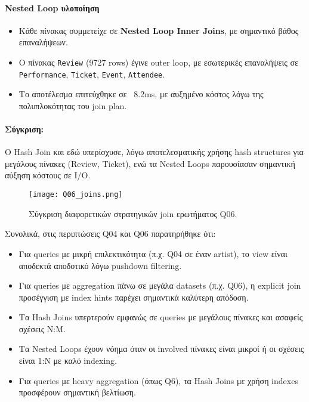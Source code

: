 \documentclass[13pt]{extarticle}
\begin{document}
\paragraph{Nested Loop υλοποίηση}
\begin{itemize}
    \item Κάθε πίνακας συμμετείχε σε \textbf{Nested Loop Inner Joins}, με σημαντικό βάθος επαναλήψεων.
    \item Ο πίνακας \texttt{Review} (9727 rows) έγινε outer loop, με εσωτερικές επαναλήψεις σε \texttt{Performance}, \texttt{Ticket}, \texttt{Event}, \texttt{Attendee}.
    \item Το αποτέλεσμα επιτεύχθηκε σε ~8.2ms, με αυξημένο κόστος λόγω της πολυπλοκότητας του join plan.
\end{itemize}

\paragraph{Σύγκριση:}  
Ο Hash Join και εδώ υπερίσχυσε, λόγω αποτελεσματικής χρήσης hash structures για μεγάλους πίνακες (Review, Ticket), ενώ τα Nested Loops παρουσίασαν σημαντική αύξηση κόστους σε I/O.

\begin{figure}[H]
    \centering
    \texttt{[image: Q06\_joins.png]}
    \caption{Σύγκριση διαφορετικών στρατηγικών join ερωτήματος Q06.}
\end{figure}

\vspace{0.5cm}
\noindent Συνολικά, στις περιπτώσεις Q04 και Q06 παρατηρήθηκε ότι:
\begin{itemize}
    \item Για queries με μικρή επιλεκτικότητα (π.χ. Q04 σε έναν artist), το view είναι αποδεκτά αποδοτικό λόγω pushdown filtering.
    \item Για queries με aggregation πάνω σε μεγάλα datasets (π.χ. Q06), η explicit join προσέγγιση με index hints παρέχει σημαντικά καλύτερη απόδοση.
    \item Τα Hash Joins υπερτερούν εμφανώς σε queries με μεγάλους πίνακες και ασαφείς σχέσεις N:M.
    \item Τα Nested Loops έχουν νόημα όταν οι involved πίνακες είναι μικροί ή οι σχέσεις είναι 1:N με καλό indexing.
    \item Για queries με heavy aggregation (όπως Q6), τα Hash Joins με χρήση indexes προσφέρουν σημαντική βελτίωση.
\end{itemize}
\end{document}
